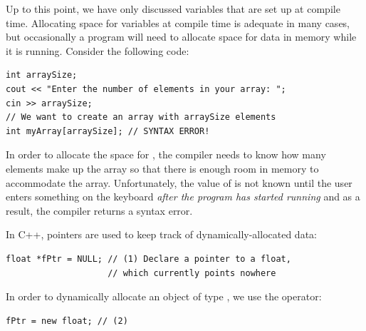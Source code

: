 
Up to this point, we have only discussed variables that are set up at compile time. 
Allocating space for variables at compile time is adequate in many cases, but occasionally a program will need to allocate space for data in memory while it is running. 
Consider the following code:

\noindent\begin{minipage}{\linewidth}\begin{lstlisting}
int arraySize;
cout << "Enter the number of elements in your array: ";
cin >> arraySize;
// We want to create an array with arraySize elements
int myArray[arraySize]; // SYNTAX ERROR!
\end{lstlisting}\end{minipage}

In order to allocate the space for , the compiler needs to know how many elements make up the array so that there is enough room in memory to accommodate the array. 
Unfortunately, the value of  is not known until the user enters something on the keyboard \emph{after the program has started running} and as a result, the compiler returns a syntax error. 

In C++, pointers are used to keep track of dynamically-allocated data:

\noindent\begin{minipage}{\linewidth}\begin{lstlisting}
float *fPtr = NULL; // (1) Declare a pointer to a float,
                    // which currently points nowhere
\end{lstlisting}\end{minipage}

In order to dynamically allocate an object of type , we use the  operator: \nopagebreak[4]

\noindent\begin{minipage}{\linewidth}\begin{lstlisting}
fPtr = new float; // (2)
\end{lstlisting}\end{minipage}

